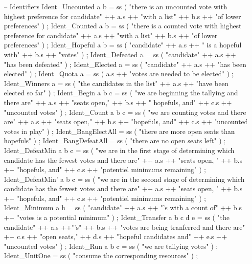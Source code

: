 \begin{lstgf}
{        -- Identifiers
        Ident_Uncounted a b
            = ss ( "there is an uncounted vote with highest preference for candidate" ++ a.s ++ "with 
                      a list" ++ b.s ++ "of lower preferences" ) ;
        Ident_Counted a b
            = ss ( "there is a counted vote with highest preference for candidate" ++ a.s ++ "with 
                      a list" ++ b.s ++ "of lower preferences" ) ;
        Ident_Hopeful a b
            = ss ( "candidate" ++ a.s ++ " is a hopeful with" ++ b.s ++ "votes" ) ;
        Ident_Defeated a
            = ss ( "candidate" ++ a.s ++ "has been defeated" ) ;
        Ident_Elected a
            = ss ( "candidate" ++ a.s ++ "has been elected" ) ;
        Ident_Quota a
            = ss ( a.s ++ "votes are needed to be elected" ) ;
        Ident_Winners a
            = ss ( "the candidates in the list" ++ a.s ++ "have been elected so far" ) ;
        Ident_Begin a b c
            = ss ( "we are beginning the tallying and there are" ++ a.s ++ "seats open," ++ b.s 
                      ++ " hopefuls, and" ++ c.s ++ "uncounted votes" ) ;
        Ident_Count a b c
            = ss ( "we are counting votes and there are" ++ a.s ++ "seats open," ++ b.s ++ "hopefuls, and" 
                      ++ c.s ++ "uncounted votes in play" ) ;
        Ident_BangElectAll
            = ss ( "there are more open seats than hopefuls" ) ;
        Ident_BangDefeatAll              
            = ss ( "there are no open seats left" ) ;
        Ident_DefeatMin a b c
            = ss ( "we are in the first stage of determining which candidate has the fewest votes and there 
                      are" ++ a.s ++ "seats open, " ++ b.s ++ "hopefuls, and" ++ c.s ++ "potentiel minimums remaining" ) ;
        Ident_DefeatMin' a b c
            = ss ( "we are in the second stage of determining which candidate has the fewest votes and there 
                      are" ++ a.s ++ "seats open, " ++ b.s ++ "hopefuls, and" ++ c.s ++ "potentiel minimums remaining" ) ;
        Ident_Minimum a b
            = ss ( "candidate" ++ a.s ++ "'s with a count of" ++ b.s ++ "votes is a potential minimum" ) ;
        Ident_Transfer a b c d e
            = ss ( "the candidate" ++ a.s ++"'s" ++ b.s ++ "votes are being tranferred and there are" ++ c.s 
                      ++ "open seats," ++ d.s ++ "hopeful candidates and" ++ e.s ++ "uncounted votes" ) ;
        Ident_Run a b c
            = ss ( "we are tallying votes" ) ;
        Ident_UnitOne                   
            = ss ( "consume the corresponding resources" ) ;

}
\end{lstgf}
